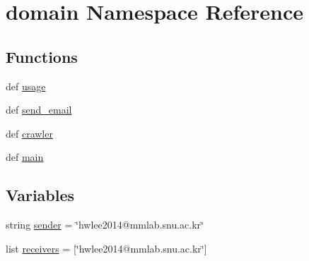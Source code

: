 \hypertarget{namespacedomain}{\section{domain Namespace Reference}
\label{namespacedomain}
}
\subsection*{Functions}
\begin{DoxyCompactItemize}
\item 
def \hyperlink{namespacedomain_ae76ecbd5ccf50c82eb60f9af778d7699}{usage}
\item 
def \hyperlink{namespacedomain_ae6f8851e0c023f92a7a42c394ae6ddd8}{send\-\_\-email}
\item 
def \hyperlink{namespacedomain_af73c25cde0b0b73e0887324bbee697db}{crawler}
\item 
def \hyperlink{namespacedomain_a165af5a005a7bb738280e6710310132f}{main}
\end{DoxyCompactItemize}
\subsection*{Variables}
\begin{DoxyCompactItemize}
\item 
string \hyperlink{namespacedomain_a0a669ce335d07e3693207b184ec45d0c}{sender} = \char`\"{}hwlee2014@mmlab.\-snu.\-ac.\-kr\char`\"{}
\item 
list \hyperlink{namespacedomain_a7bd9143de7ed5ad9219ee68c3fb7800e}{receivers} = \mbox{[}\char`\"{}hwlee2014@mmlab.\-snu.\-ac.\-kr\char`\"{}\mbox{]}
\end{DoxyCompactItemize}


